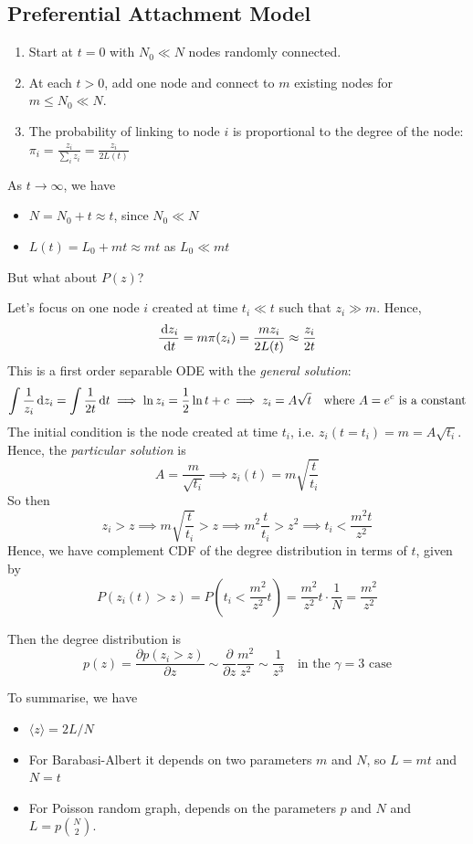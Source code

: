 \documentclass[12pt]{article}
\theoremstyle{definition}
\newcommand{\diff}[1]{\hspace{1.5pt}\mathrm{d}{#1}}
\begin{document}
\subsection{Preferential Attachment Model}

\begin{enumerate}
    \item Start at $t=0$ with $N_0\ll N$ nodes randomly connected. 
    \item At each $t>0$, add one node and connect to $m$ existing nodes for $m\leq N_0 \ll N$. 
    \item The probability of linking to node $i$ is proportional to the degree of the node: $\pi_i=\frac{z_i}{\sum_i z_i}=\frac{z_i}{2L(t)}$
\end{enumerate}

As $t\to\infty$, we have 
\begin{itemize}
    \item $N=N_0+t\approx t$, since $N_0\ll N$
    \item $L(t)=L_0+mt\approx mt$ as $L_0\ll mt$
\end{itemize}
But what about $P(z)$? 

Let's focus on one node $i$ created at time $t_i\ll t$ such that $z_i\gg m$. Hence, 
\[
    \frac{\diff{z_i}}{\diff{t}} = m\pi(z_i) =\frac{mz_i}{2L(t)} \approx \frac{z_i}{2t}
\]
This is a first order separable ODE with the \textit{general solution}: 
\[
\int \frac{1}{z_i}\diff{z_i} = \int\frac{1}{2t}\diff{t}\implies \ln z_i=\frac{1}{2}\ln t+c\implies z_i=A\sqrt{t} \quad\text{where }A=e^c\text{ is a constant}
\]
The initial condition is the node created at time $t_i$, i.e. $z_i(t=t_i) = m = A\sqrt{t_i}$. Hence, the \textit{particular solution} is 
\[
    A=\frac{m}{\sqrt{t_i}} \implies z_i(t) =m \sqrt{\frac{t}{t_i}}
\]
So then
\[
z_i>z\implies m\sqrt{\frac{t}{t_i}}>z\implies m^2\frac{t}{t_i}>z^2\implies t_i<\frac{m^2t}{z^2}
\]
Hence, we have complement CDF of the degree distribution in terms of $t$, given by 
\[
    P\left(z_i(t)>z\right) = P\left(t_i<\frac{m^2}{z^2}t\right) =\frac{m^2}{z^2}t\cdot\frac{1}{N}=\frac{m^2}{z^2}
\]

Then the degree distribution is
\[
p(z)=\frac{\partial p(z_i>z)}{\partial z}\sim \frac{\partial}{\partial z}\frac{m^2}{z^2}\sim\frac{1}{z^3} \quad\text{in the }\gamma=3\text{ case}
\]

To summarise, we have
\begin{itemize}
    \item $\langle z\rangle = 2L/N$
    \item For Barabasi-Albert it depends on two parameters $m$ and $N$, so $L=mt$ and $N=t$
    \item For Poisson random graph, depends on the parameters $p$ and $N$ and $L=p\binom N2$. 
\end{itemize}
\end{document}
